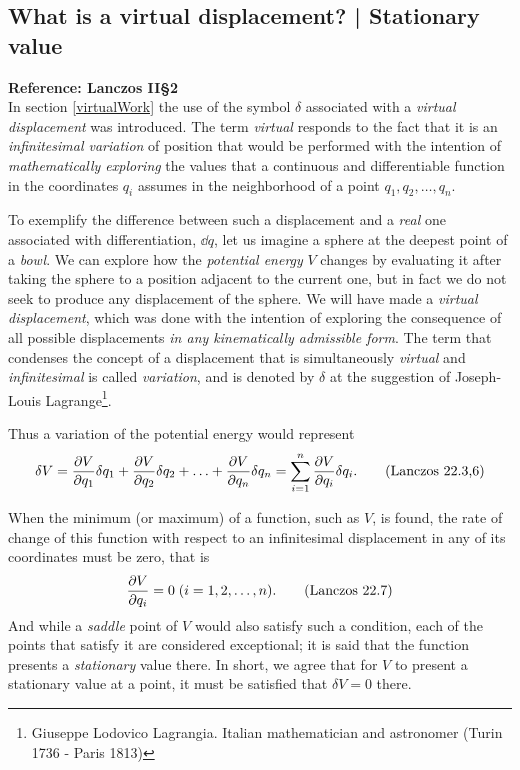 \documentclass[12pt, spanish, a4paper, ]{article}
\begin{document}
\subsection{What is a virtual displacement? | Stationary value}\label{virtualDisplacement}
\textbf{Reference: Lanczos II\S2}\\

In section \ref{virtualWork} the use of the symbol \(\delta\) associated with a \emph{virtual displacement} was introduced.
The term \emph{virtual} responds to the fact that it is an \emph{infinitesimal variation} of position that would be performed with the intention of \emph{mathematically exploring} the values that a continuous and differentiable function in the coordinates \(q_i\) assumes in the neighborhood of a point \(q_1, q_2, \ldots, q_n\).

To exemplify the difference between such a displacement and a \emph{real} one associated with differentiation, \(\dd q\), let us imagine a sphere at the deepest point of a \emph{bowl}.
We can explore how the \emph{potential energy} \(V\) changes by evaluating it after taking the sphere to a position adjacent to the current one, but in fact we do not seek to produce any displacement of the sphere.
We will have made a \emph{virtual displacement}, which was done with the intention of exploring the consequence of all possible displacements \emph{in any kinematically admissible form}.
The term that condenses the concept of a displacement that is simultaneously \emph{virtual} and \emph{infinitesimal} is called \emph{variation}, and is denoted by \(\delta\) at the suggestion of Joseph-Louis Lagrange\footnote{Giuseppe Lodovico Lagrangia. Italian mathematician and astronomer (Turin 1736 - Paris 1813)}.

Thus a variation of the potential energy would represent
\begin{equation}\label{Lanczos22.3,6}
    \delta V = 
	\pdv{V}{q_1} \delta q_1+ \pdv{V}{q_2} \delta q_2+ \ldots + \pdv{V}{q_n} \delta q_n =
	\sum^{n}_{i=1} \pdv{V}{q_i} \delta q_i.
    \tag{Lanczos 22.3,6}
\end{equation}

When the minimum (or maximum) of a function, such as \(V\), is found, the rate of change of this function with respect to an infinitesimal displacement in any of its coordinates must be zero, that is
\begin{equation}\label{Lanczos22.7}
	\pdv{V}{q_i} = 0\; (i= 1, 2, \ldots, n).
    \tag{Lanczos 22.7}
\end{equation}
And while a \emph{saddle} point of \(V\) would also satisfy such a condition, each of the points that satisfy it are considered exceptional; it is said that the function presents a \emph{stationary} value there.
In short, we agree that for \(V\) to present a stationary value at a point, it must be satisfied that \(\delta V=0\) there.
\end{document}
